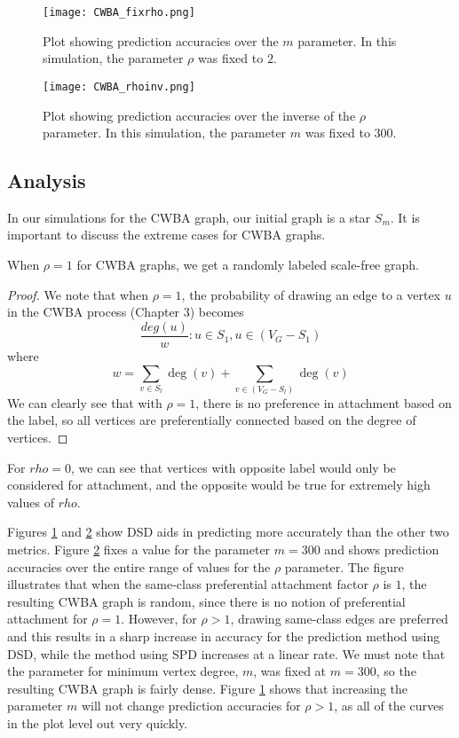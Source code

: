 \begin{figure}[H]
\centering
\texttt{[image: CWBA\_fixrho.png]}
\caption{Plot showing prediction accuracies over the $m$ parameter. In this simulation, the parameter $\rho$ was fixed to $2$.}
\label{fig:CWBA_fixrho}
\end{figure}

\begin{figure}[H]
\centering
\texttt{[image: CWBA\_rhoinv.png]}
\caption{Plot showing prediction accuracies over the inverse of the $\rho$
parameter. In this simulation, the parameter $m$ was fixed to $300$.}
\label{fig:CWBA_rhoinv}
\end{figure}

\subsection{Analysis}
In our simulations for the CWBA graph, our initial graph is a star $S_m$.
It is important to discuss the extreme cases for CWBA graphs.

\begin{proposition}
When $\rho=1$ for CWBA graphs, we get a randomly labeled scale-free graph.
\end{proposition}
\begin{proof}
We note that when $\rho=1$, the probability of drawing an edge to a vertex $u$ in the CWBA process (Chapter 3) becomes
$$\frac{deg(u)}{w} : u \in S_1, u \in (V_G - S_1)$$
where
$$w = \sum_{v \in S_l}\deg(v) + \sum_{v \in (V_G - S_l)}\deg(v)$$
We can clearly see that with $\rho=1$, there is no preference in attachment
based on the label, so all vertices are preferentially connected based on
the degree of vertices.
\end{proof}

For $rho=0$, we can see that vertices with opposite label would only be
considered for attachment, and the opposite would be true for extremely 
high values of $rho$.

Figures \ref{fig:CWBA_fixrho} and \ref{fig:CWBA_rhoinv} show DSD aids in
predicting more accurately than the other two metrics. Figure 
\ref{fig:CWBA_rhoinv} fixes a value for the parameter $m = 300$ and shows
prediction accuracies over the entire range of values for the $\rho$
parameter. The figure illustrates that when the same-class preferential
attachment factor $\rho$ is $1$, the resulting CWBA graph is random, since
there is no notion of preferential attachment for $\rho=1$. However, for
$\rho > 1$, drawing same-class edges are preferred and this results in a
sharp increase in accuracy for the prediction method using DSD, while the
method using SPD increases at a linear rate. We must note that the 
parameter for minimum vertex degree, $m$, was fixed at $m=300$, so the
resulting CWBA graph is fairly dense. Figure \ref{fig:CWBA_fixrho} shows 
that increasing the parameter $m$ will not change prediction accuracies for
$\rho > 1$, as all of the curves in the plot level out very quickly.

